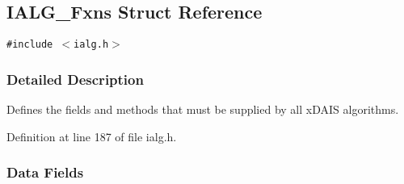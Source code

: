 \hypertarget{struct_i_a_l_g___fxns}{
\subsection{IALG\_\-Fxns Struct Reference}
\label{struct_i_a_l_g___fxns}
}
{\tt \#include $<$ialg.h$>$}



\subsubsection{Detailed Description}
Defines the fields and methods that must be supplied by all x\-DAIS algorithms. 



Definition at line 187 of file ialg.h.\subsubsection*{Data Fields}
